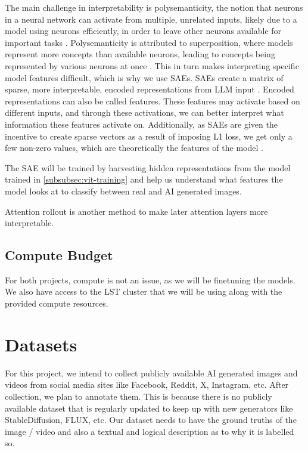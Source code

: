 \documentclass[10pt,twocolumn,letterpaper]{article}
\begin{document}
The main challenge in interpretability is polysemanticity, the notion that neurons in a neural network can activate from multiple, unrelated inputs, likely due to a model using neurons efficiently, in order to leave other neurons available for important tasks \cite{olah2020zoom}. Polysemanticity is attributed to superposition, where models represent more concepts than available neurons, leading to concepts being represented by various neurons at once  \cite{karvonen_intuitive_2024}.  This in turn makes interpreting specific model features difficult, which is why we use SAEs. SAEs create a matrix of sparse, more interpretable, encoded representations from LLM input  \cite{karvonen_intuitive_2024}. Encoded representations can also be called features. These features may activate based on different inputs, and through these activations, we can better interpret what information these features activate on. Additionally, as SAEs are given the incentive to create sparse vectors as a result of imposing L1 loss, we get only a few non-zero values, which are theoretically the  features of the model \cite{kutsyk_sparse_2024}. 

The SAE will be trained by harvesting hidden representations from the model trained in \ref{subsubsec:vit-training} and help us understand what features the model looks at to classify between real and AI generated images.



Attention rollout \cite{abnarQuantifyingAttentionFlow2020} is another method to make later attention layers more interpretable.

\subsection{Compute Budget}
For both projects, compute is not an issue, as we will be finetuning the models. We also have access to the LST cluster that we will be using along with the provided compute resources.

\section{Datasets}
For this project, we intend to collect publicly available AI generated images  and videos from social media sites like Facebook, Reddit, X, Instagram, etc. After collection, we plan to annotate them. This is because there is no publicly available dataset that is regularly updated to keep up with new generators like StableDiffusion, FLUX, etc. Our dataset needs to have the ground truths of the image / video and also a textual and logical description as to  why it is labelled so. 
\end{document}
